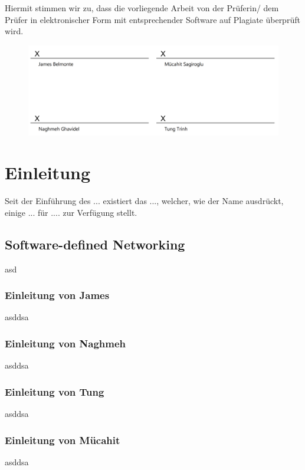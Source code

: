 \documentclass[fontsize=12pt,paper=a4,open=any,parskip=half,
  twoside=false,toc=listof,toc=bibliography,fleqn,leqno,
  captions=nooneline,captions=tableabove,british]{scrbook}
\begin{document}
Hiermit stimmen wir zu, dass die vorliegende Arbeit von der Prüferin/ dem Prüfer in elektronischer Form
mit entsprechender Software auf Plagiate überprüft wird.

\begin{figure}[H]
	\centering
	\includegraphics[width=1\linewidth]{Bilder/unterschrift}
\end{figure}

\tableofcontents
\listoffigures
\listoftables
\lstlistoflistings

\mainmatter %



\chapter{Einleitung}\label{ch:intro}
Seit der Einführung des ... existiert das ..., welcher, wie der Name ausdrückt, einige ... für .... zur Verfügung stellt.

\section{Software-defined Networking}\label{sdn}
asd
\subsection{Einleitung von James}\label{einl-james}
asddsa
\subsection{Einleitung von Naghmeh}\label{einl-naghmeh}
asddsa
\subsection{Einleitung von Tung}\label{einl-tung}
asddsa
\subsection{Einleitung von Mücahit}\label{einl-müco}
asddsa
\end{document}
